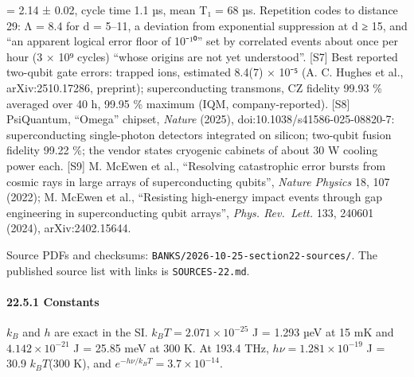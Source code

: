 \documentclass[
]{article}
\begin{document}
= 2.14 ± 0.02, cycle time 1.1 µs, mean T₁ = 68 µs. Repetition codes to
distance 29: Λ = 8.4 for d = 5--11, a deviation from exponential
suppression at d ≥ 15, and ``an apparent logical error floor of 10⁻¹⁰''
set by correlated events about once per hour (3 × 10⁹ cycles) ``whose
origins are not yet understood''. {[}S7{]} Best reported two-qubit gate
errors: trapped ions, estimated 8.4(7) × 10⁻⁵ (A. C. Hughes et al.,
arXiv:2510.17286, preprint); superconducting transmons, CZ fidelity
99.93 \% averaged over 40 h, 99.95 \% maximum (IQM, company-reported).
{[}S8{]} PsiQuantum, ``Omega'' chipset, \emph{Nature} (2025),
d\allowbreak{}o\allowbreak{}i\allowbreak{}:\allowbreak{}1\allowbreak{}0\allowbreak{}.\allowbreak{}1\allowbreak{}0\allowbreak{}3\allowbreak{}8\allowbreak{}/\allowbreak{}s\allowbreak{}4\allowbreak{}1\allowbreak{}5\allowbreak{}8\allowbreak{}6\allowbreak{}-\allowbreak{}0\allowbreak{}2\allowbreak{}5\allowbreak{}-\allowbreak{}0\allowbreak{}8\allowbreak{}8\allowbreak{}2\allowbreak{}0\allowbreak{}-\allowbreak{}7\allowbreak{}:
superconducting single-photon detectors integrated on silicon; two-qubit
fusion fidelity 99.22 \%; the vendor states cryogenic cabinets of about
30 W cooling power each. {[}S9{]} M. McEwen et al., ``Resolving
catastrophic error bursts from cosmic rays in large arrays of
superconducting qubits'', \emph{Nature Physics} 18, 107 (2022); M.
McEwen et al., ``Resisting high-energy impact events through gap
engineering in superconducting qubit arrays'', \emph{Phys. Rev.~Lett.}
133, 240601 (2024), arXiv:2402.15644.

Source PDFs and checksums:
\texttt{B\allowbreak{}A\allowbreak{}N\allowbreak{}K\allowbreak{}S\allowbreak{}/\allowbreak{}2\allowbreak{}0\allowbreak{}2\allowbreak{}6\allowbreak{}-\allowbreak{}1\allowbreak{}0\allowbreak{}-\allowbreak{}2\allowbreak{}5\allowbreak{}-\allowbreak{}s\allowbreak{}e\allowbreak{}c\allowbreak{}t\allowbreak{}i\allowbreak{}o\allowbreak{}n\allowbreak{}2\allowbreak{}2\allowbreak{}-\allowbreak{}s\allowbreak{}o\allowbreak{}u\allowbreak{}r\allowbreak{}c\allowbreak{}e\allowbreak{}s\allowbreak{}/}.
The published source list with links is \texttt{SOURCES-22.md}.

\paragraph{22.5.1 Constants}\label{constants}

\(k_B\) and \(h\) are exact in the SI. \(k_B T = 2.071 \times 10^{-25}\)
J = 1.293 µeV at 15 mK and \(4.142 \times 10^{-21}\) J = 25.85 meV at
300 K. At 193.4 THz, \(h\nu = 1.281 \times 10^{-19}\) J = 30.9
\(k_B T\)(300 K), and \(e^{-h\nu/k_BT} = 3.7 \times 10^{-14}\).
\end{document}
